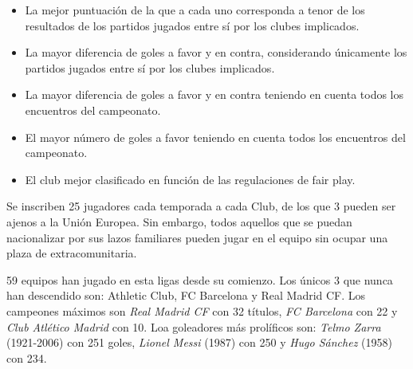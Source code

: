 \begin{itemize}

	\item La mejor puntuación de la que a cada uno corresponda a tenor de los resultados de los partidos jugados entre sí por los clubes implicados.

	\item La mayor diferencia de goles a favor y en contra, considerando únicamente los partidos jugados entre sí por los clubes implicados.

	\item La mayor diferencia de goles a favor y en contra teniendo en cuenta todos los encuentros del campeonato.

	\item El mayor número de goles a favor teniendo en cuenta todos los encuentros del campeonato.

	\item El club mejor clasificado en función de las regulaciones de fair play.

\end{itemize}

Se inscriben 25 jugadores cada temporada a cada Club, de los que 3 pueden ser ajenos a la Unión Europea. Sin embargo, todos aquellos que se puedan nacionalizar por sus lazos familiares pueden jugar en el equipo sin ocupar una plaza de extracomunitaria.

59 equipos han jugado en esta ligas desde su comienzo. Los únicos 3 que nunca han descendido son: Athletic Club, FC Barcelona y Real Madrid CF. Los campeones máximos son \emph{Real Madrid CF} con 32 títulos, \emph{FC Barcelona} con 22 y \emph{Club Atlético Madrid} con 10. Loa goleadores más prolíficos son: \emph{Telmo Zarra} (1921-2006) con 251 goles, \emph{Lionel Messi} (1987) con 250 y \emph{Hugo Sánchez} (1958) con 234. \cite{primera}


